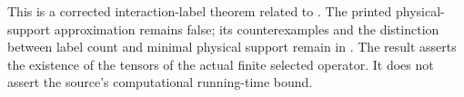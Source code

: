This is a corrected interaction-label theorem related to
\cite[Theorems on cluster approximation and representation, lines 1270--1303]{Arad2016RigorousRG}.
The printed physical-support approximation remains false; its
counterexamples and the distinction between label count and minimal
physical support remain in \cite{gap:alvv16_cluster_approximation}.
The result asserts the existence of the tensors of the actual finite
selected operator. It does not assert the source's computational
running-time bound.
